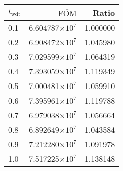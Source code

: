 \begin{tabular}{lrr}
\toprule
$t_{\mathrm{wdt}}$ & $\overline{\mathrm{FOM}}$ &    Ratio \\
\midrule
               0.1 &   6.604787$\times 10^{7}$ & 1.000000 \\
               0.2 &   6.908472$\times 10^{7}$ & 1.045980 \\
               0.3 &   7.029599$\times 10^{7}$ & 1.064319 \\
               0.4 &   7.393059$\times 10^{7}$ & 1.119349 \\
               0.5 &   7.000481$\times 10^{7}$ & 1.059910 \\
               0.6 &   7.395961$\times 10^{7}$ & 1.119788 \\
               0.7 &   6.979038$\times 10^{7}$ & 1.056664 \\
               0.8 &   6.892649$\times 10^{7}$ & 1.043584 \\
               0.9 &   7.212280$\times 10^{7}$ & 1.091978 \\
               1.0 &   7.517225$\times 10^{7}$ & 1.138148 \\
\bottomrule
\end{tabular}
